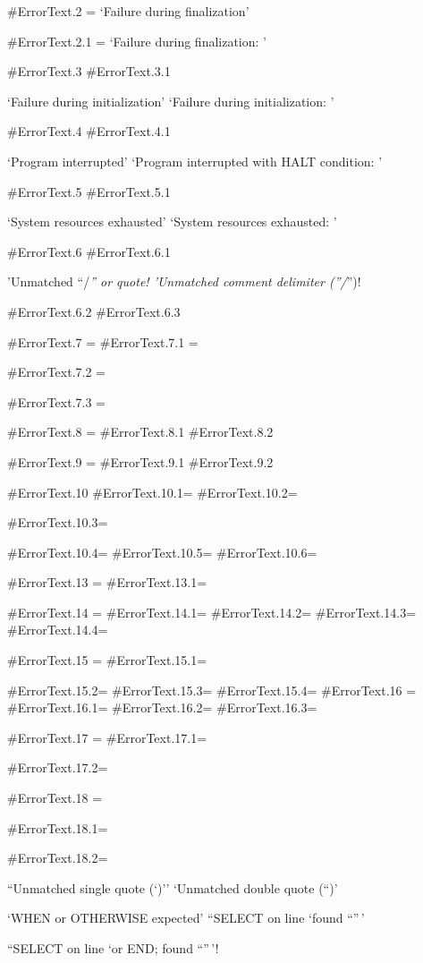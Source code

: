 \#ErrorText.2 = `Failure during finalization'

\#ErrorText.2.1 = `Failure during finalization: '

\#ErrorText.3 \#ErrorText.3.1

`Failure during initialization' `Failure during initialization: '

\#ErrorText.4 \#ErrorText.4.1

`Program interrupted' `Program interrupted with HALT condition: '

\#ErrorText.5 \#ErrorText.5.1

`System resources exhausted' `System resources exhausted: '

\#ErrorText.6 \#ErrorText.6.1

'Unmatched ``/\emph{'' or quote! 'Unmatched comment delimiter (''/}'')!

\#ErrorText.6.2 \#ErrorText.6.3

\#ErrorText.7 = \#ErrorText.7.1 =

\#ErrorText.7.2 =

\#ErrorText.7.3 =

\#ErrorText.8 = \#ErrorText.8.1 \#ErrorText.8.2

\#ErrorText.9 = \#ErrorText.9.1 \#ErrorText.9.2

\#ErrorText.10 \#ErrorText.10.1= \#ErrorText.10.2=

\#ErrorText.10.3=

\#ErrorText.10.4= \#ErrorText.10.5= \#ErrorText.10.6=

\#ErrorText.13 = \#ErrorText.13.1=

\#ErrorText.14 = \#ErrorText.14.1= \#ErrorText.14.2= \#ErrorText.14.3=
\#ErrorText.14.4=

\#ErrorText.15 = \#ErrorText.15.1=

\#ErrorText.15.2= \#ErrorText.15.3= \#ErrorText.15.4= \#ErrorText.16 =
\#ErrorText.16.1= \#ErrorText.16.2= \#ErrorText.16.3=

\#ErrorText.17 = \#ErrorText.17.1=

\#ErrorText.17.2=

\#ErrorText.18 =

\#ErrorText.18.1=

\#ErrorText.18.2=

``Unmatched single quote (`)'' `Unmatched double quote (``)'

`WHEN or OTHERWISE expected' ``SELECT on line `found ``''\,'

``SELECT on line `or END; found ``''\,'!

